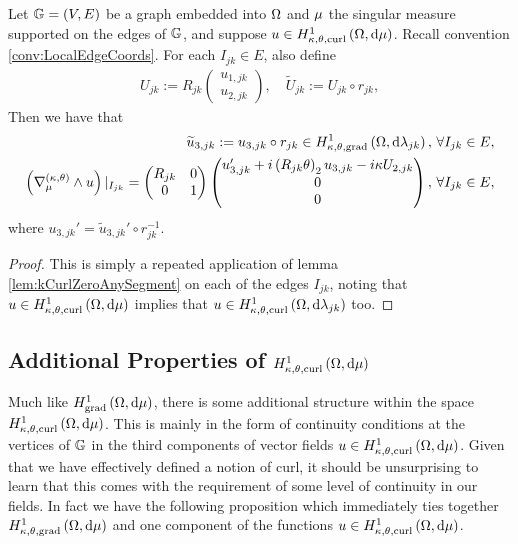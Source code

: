 \begin{theorem} \label{thm:ktTanCurlsGraphs}
	Let $\mathbb{G}=\left( V,E \right)$ be a graph embedded into $\Omega$ and $\mu$ the singular measure supported on the edges of $\mathbb{G}$, and suppose $u\in H^1_{\kappa,\theta,\mathrm{curl}}\left( \Omega, \mathrm{d}\mu \right)$.
	Recall convention \ref{conv:LocalEdgeCoords}.
	For each $I_{jk}\in E$, also define
	\begin{align*}
		U_{jk} := R_{jk}\begin{pmatrix} u_{1,jk} \\ u_{2,jk} \end{pmatrix}, \quad
		\widetilde{U}_{jk} := U_{jk} \circ r_{jk},
	\end{align*}
	Then we have that 
	\begin{align*}
		\widetilde{u}_{3,jk} := u_{3,jk}\circ r_{jk}\in H^1_{\kappa,\theta,\mathrm{grad}}\left( \Omega, \mathrm{d}\lambda_{jk} \right), &\ \forall I_{jk}\in E, \\
		\left( \nabla_{\mu}^{\left( \kappa, \theta \right)}\wedge u \right)\vert_{I_{jk}} = \begin{pmatrix} R_{jk} & 0 \\ 0 & 1 \end{pmatrix} \begin{pmatrix} u_{3,jk}' + i\left( R_{jk}\theta \right)_2 u_{3,jk} - i\kappa U_{2,jk} \\ 0 \\ 0 \end{pmatrix}, 
		&\ \forall I_{jk}\in E,
	\end{align*}
	where $u_{3,jk}' = \widetilde{u}_{3,jk}' \circ r_{jk}^{-1}$.
\end{theorem}
\begin{proof}
	This is simply a repeated application of lemma \ref{lem:kCurlZeroAnySegment} on each of the edges $I_{jk}$, noting that $u\in H^1_{\kappa,\theta,\mathrm{curl}}\left( \Omega, \mathrm{d}\mu \right)$ implies that $u\in H^1_{\kappa,\theta,\mathrm{curl}}\left( \Omega, \mathrm{d}\lambda_{jk} \right)$ too.
\end{proof}

\subsection{Additional Properties of $H^1_{\kappa,\theta,\mathrm{curl}}\left( \Omega, \mathrm{d}\mu \right)$} \label{sec:ktcurlSobExtraProperties}
Much like $H^1_\mathrm{grad}\left( \Omega, \mathrm{d}\mu \right)$, there is some additional structure within the space $H^1_{\kappa,\theta,\mathrm{curl}}\left( \Omega, \mathrm{d}\mu \right)$.
This is mainly in the form of continuity conditions at the vertices of $\mathbb{G}$ in the third components of vector fields $u\in H^1_{\kappa,\theta,\mathrm{curl}}\left( \Omega, \mathrm{d}\mu \right)$.
Given that we have effectively defined a notion of curl, it should be unsurprising to learn that this comes with the requirement of some level of continuity in our fields.
In fact we have the following proposition which immediately ties together $H^1_{\kappa,\theta,\mathrm{grad}}\left( \Omega, \mathrm{d}\mu \right)$ and one component of the functions $u\in H^1_{\kappa,\theta,\mathrm{curl}}\left( \Omega, \mathrm{d}\mu \right)$.

